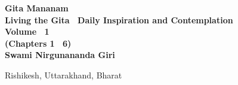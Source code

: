 \begin{titlepage}
    \begin{center}
        \vspace*{0.5cm}
            
        {\HUGE
        \textbf{\bookTitleColor\fontsize{40}{60}\arialUC Gita Mananam}}
        \vspace{0.5cm}
        \textbf{\\ \arialUC \color{black}Living the Gita \textemdash \ Daily Inspiration and Contemplation}\\ 
		\vspace{1.0cm}
		\textbf{{\large \arialUC\color{black} Volume \textemdash \ 1}\\{\normalsize \arialUC\color{black} (Chapters 1 \textemdash \ 6)}}\\		
        \vspace{6.0cm}
        \textbf{{\Large \bookAuthColor\arialUC Swami Nirgunananda Giri}}\\    
        
		
            
        \vfill
            
        
            
        \vspace{0.1cm}
        {\color{black}    
		
		{{\normalsize \arialUC\color{black} Rishikesh, Uttarakhand, Bharat}}
        }
    \end{center}
\end{titlepage}
\nopagecolor%